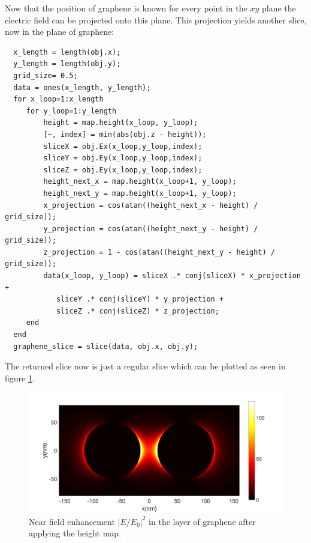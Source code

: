 Now that the position of graphene is known for every point in the $xy$ plane the electric field can be projected onto this plane. This projection yields another slice, now in the plane of graphene:

\begin{verbatim}
  x_length = length(obj.x);
  y_length = length(obj.y);
  grid_size= 0.5;
  data = ones(x_length, y_length);
  for x_loop=1:x_length
     for y_loop=1:y_length
         height = map.height(x_loop, y_loop);
         [~, index] = min(abs(obj.z - height));
         sliceX = obj.Ex(x_loop,y_loop,index);
         sliceY = obj.Ey(x_loop,y_loop,index);
         sliceZ = obj.Ey(x_loop,y_loop,index);
         height_next_x = map.height(x_loop+1, y_loop);
         height_next_y = map.height(x_loop+1, y_loop);
         x_projection = cos(atan((height_next_x - height) / grid_size));
         y_projection = cos(atan((height_next_y - height) / grid_size));
         z_projection = 1 - cos(atan((height_next_y - height) / grid_size));
         data(x_loop, y_loop) = sliceX .* conj(sliceX) * x_projection +
            sliceY .* conj(sliceY) * y_projection +
            sliceZ .* conj(sliceZ) * z_projection;
     end
  end
  graphene_slice = slice(data, obj.x, obj.y);
\end{verbatim}

The returned slice now is just a regular slice which can be plotted as seen in figure \ref{fig:projected}.

\begin{figure}[!h]
  \centering
  \includegraphics[width=\textwidth]{./images/graphene-layer.png}
  \caption{Near field enhancement $|E/E_0|^2$ in the layer of graphene after applying the height map. }
  \label{fig:projected}
\end{figure}
